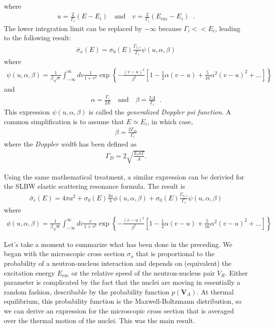 \documentclass[11pt]{article}
\renewcommand\vec{\mathbf}
\begin{document}
where
\begin{align}
  u = \frac{2}{\Gamma_i}\left(E - E_i\right)
  \quad \text{and} \quad
  v = \frac{2}{\Gamma_i}\left(E_\text{exc} - E_i\right) \;\;.
\end{align}
The lower integration limit can be replaced by \(-\infty\) because \(\Gamma_i << E_i\), leading to the following result:
\begin{align}
  \bar{\sigma}_x(E) = \sigma_0(E) \frac{\Gamma_{x,i}}{\Gamma_i} \psi(u,\alpha,\beta)
\end{align}
where
\begin{align}
  \psi(u,\alpha,\beta) = \frac{1}{\beta\sqrt{\pi}}
                         \int_{-\infty}^\infty dv \frac{1}{1+v^2} \exp\left\{ -\frac{(v-u)^2}{\beta^2}
                         \left[ 1 - \frac{1}{2}\alpha(v-u) + \frac{5}{16}\alpha^2(v-u)^2 + \hdots \right] \right\}
\end{align}
and
\begin{align}
  \alpha = \frac{\Gamma_i}{2E}
  \quad \text{and} \quad
  \beta = \frac{2\Delta}{\Gamma_i} \;\;.
\end{align}
This expression \(\psi(u,\alpha,\beta)\) is called the \emph{generalized Doppler psi function}.  A common simplification is to assume that \(E \simeq E_i\), in which case,
\begin{align}
  \beta = \frac{2\Gamma_D}{\Gamma_i}
\end{align}
where the \emph{Doppler width} has been defined as
\begin{align}
  \Gamma_D = 2 \sqrt{\frac{E_i kT}{A}}.
\end{align}

Using the same mathematical treatment, a similar expression can be derivied for the SLBW elastic scattering resonance formula.  The result is
\begin{align}
  \label{eq::dopplerSLBWe}
  \bar{\sigma}_e(E) = 4\pi a^2 + \sigma_0(E)\frac{2a}{\lambda}\phi(u,\alpha,\beta) + \sigma_0(E)\frac{\Gamma_{n,i}}{\Gamma_i}\psi(u,\alpha,\beta)
\end{align}
where
\begin{align}
  \phi(u,\alpha,\beta) = \frac{1}{\beta\sqrt{\pi}}
                         \int_{-\infty}^\infty dv \frac{v}{1+v^2} \exp\left\{ -\frac{(v-u)^2}{\beta^2}
                         \left[ 1 - \frac{1}{2}\alpha(v-u) + \frac{5}{16}\alpha^2(v-u)^2 + \hdots \right] \right\}
\end{align}

Let's take a moment to summarize what has been done in the preceding. We began with the microscopic cross section \(\sigma_x\) that is proportional to the probability of a neutron-nucleus interaction and depends on (equivalent) the excitation energy \(E_\text{exc}\) or the relative speed of the neutron-nucleus pair \(V_R\).  Either parameter is complicated by the fact that the nuclei are moving in essentially a random fashion, describable by the probability function \(p(\vec{V}_A)\).  At thermal equilibrium, this probability function is the Maxwell-Boltzmann distribution, so we can derive an expression for the microscopic cross section that is averaged over the thermal motion of the nuclei.  This was the main result.
\end{document}
